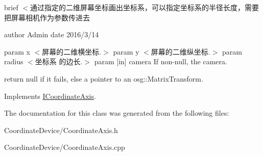 brief $<$通过指定的二维屏幕坐标画出坐标系，可以指定坐标系的半径长度，需要把屏幕相机作为参数传进去

author Admin date 2016/3/14

param x $<$屏幕的二维横坐标.$>$ param y $<$屏幕的二维纵坐标.$>$ param radius $<$坐标系 的边长.$>$ param \mbox{[}in\mbox{]} camera If non-\/null, the camera.

return null if it fails, else a pointer to an osg\+::\+Matrix\+Transform. 

Implements \hyperlink{class_i_coordinate_axis_a4e5694296507a4e86e0fdfbd4ba6a4b8}{I\+Coordinate\+Axis}.



The documentation for this class was generated from the following files\+:\begin{DoxyCompactItemize}
\item 
Coordinate\+Device/Coordinate\+Axis.\+h\item 
Coordinate\+Device/Coordinate\+Axis.\+cpp\end{DoxyCompactItemize}
